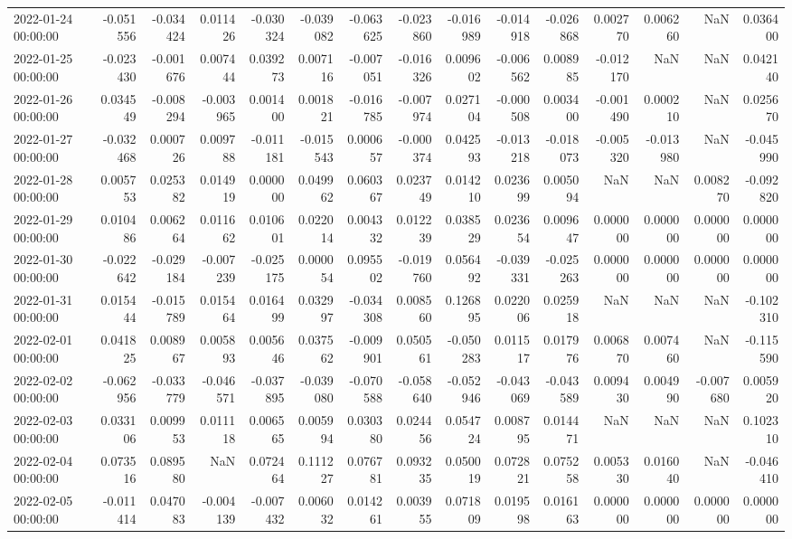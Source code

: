 \begin{tabular}{lrrrrrrrrrrrrrr}
2022-01-24 00:00:00 & -0.051556 & -0.034424 & 0.011426 & -0.030324 & -0.039082 & -0.063625 & -0.023860 & -0.016989 & -0.014918 & -0.026868 & 0.002770 & 0.006260 & NaN & 0.036400 \\
2022-01-25 00:00:00 & -0.023430 & -0.001676 & 0.007444 & 0.039273 & 0.007116 & -0.007051 & -0.016326 & 0.009602 & -0.006562 & 0.008985 & -0.012170 & NaN & NaN & 0.042140 \\
2022-01-26 00:00:00 & 0.034549 & -0.008294 & -0.003965 & 0.001400 & 0.001821 & -0.016785 & -0.007974 & 0.027104 & -0.000508 & 0.003400 & -0.001490 & 0.000210 & NaN & 0.025670 \\
2022-01-27 00:00:00 & -0.032468 & 0.000726 & 0.009788 & -0.011181 & -0.015543 & 0.000657 & -0.000374 & 0.042593 & -0.013218 & -0.018073 & -0.005320 & -0.013980 & NaN & -0.045990 \\
2022-01-28 00:00:00 & 0.005753 & 0.025382 & 0.014919 & 0.000000 & 0.049962 & 0.060367 & 0.023749 & 0.014210 & 0.023699 & 0.005094 & NaN & NaN & 0.008270 & -0.092820 \\
2022-01-29 00:00:00 & 0.010486 & 0.006264 & 0.011662 & 0.010601 & 0.022014 & 0.004332 & 0.012239 & 0.038529 & 0.023654 & 0.009647 & 0.000000 & 0.000000 & 0.000000 & 0.000000 \\
2022-01-30 00:00:00 & -0.022642 & -0.029184 & -0.007239 & -0.025175 & 0.000054 & 0.095502 & -0.019760 & 0.056492 & -0.039331 & -0.025263 & 0.000000 & 0.000000 & 0.000000 & 0.000000 \\
2022-01-31 00:00:00 & 0.015444 & -0.015789 & 0.015464 & 0.016499 & 0.032997 & -0.034308 & 0.008560 & 0.126895 & 0.022006 & 0.025918 & NaN & NaN & NaN & -0.102310 \\
2022-02-01 00:00:00 & 0.041825 & 0.008967 & 0.005893 & 0.005646 & 0.037562 & -0.009901 & 0.050561 & -0.050283 & 0.011517 & 0.017976 & 0.006870 & 0.007460 & NaN & -0.115590 \\
2022-02-02 00:00:00 & -0.062956 & -0.033779 & -0.046571 & -0.037895 & -0.039080 & -0.070588 & -0.058640 & -0.052946 & -0.043069 & -0.043589 & 0.009430 & 0.004990 & -0.007680 & 0.005920 \\
2022-02-03 00:00:00 & 0.033106 & 0.009953 & 0.011118 & 0.006565 & 0.005994 & 0.030380 & 0.024456 & 0.054724 & 0.008795 & 0.014471 & NaN & NaN & NaN & 0.102310 \\
2022-02-04 00:00:00 & 0.073516 & 0.089580 & NaN & 0.072464 & 0.111227 & 0.076781 & 0.093235 & 0.050019 & 0.072821 & 0.075258 & 0.005330 & 0.016040 & NaN & -0.046410 \\
2022-02-05 00:00:00 & -0.011414 & 0.047083 & -0.004139 & -0.007432 & 0.006032 & 0.014261 & 0.003955 & 0.071809 & 0.019598 & 0.016163 & 0.000000 & 0.000000 & 0.000000 & 0.000000 \\

\end{tabular}
